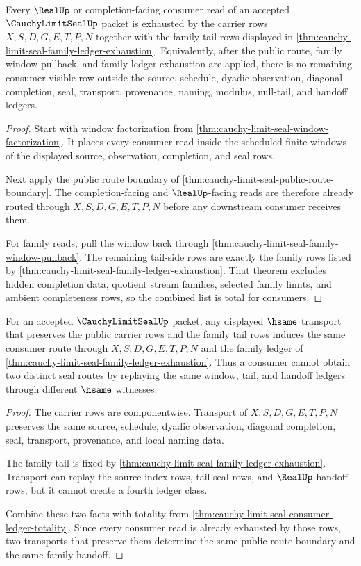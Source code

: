 \begin{theorem}
\label{thm:cauchy-limit-seal-consumer-ledger-totality}
Every $\RealUp$ or completion-facing consumer read of an accepted $\CauchyLimitSealUp$ packet is exhausted by the carrier rows $X,S,D,G,E,T,P,N$ together with the family tail rows displayed in \autoref{thm:cauchy-limit-seal-family-ledger-exhaustion}. Equivalently, after the public route, family window pullback, and family ledger exhaustion are applied, there is no remaining consumer-visible row outside the source, schedule, dyadic observation, diagonal completion, seal, transport, provenance, naming, modulus, null-tail, and handoff ledgers.
\end{theorem}
\begin{proof}
Start with window factorization from \autoref{thm:cauchy-limit-seal-window-factorization}. It places every consumer read inside the scheduled finite windows of the displayed source, observation, completion, and seal rows.

Next apply the public route boundary of \autoref{thm:cauchy-limit-seal-public-route-boundary}. The completion-facing and $\RealUp$-facing reads are therefore already routed through $X,S,D,G,E,T,P,N$ before any downstream consumer receives them.

For family reads, pull the window back through \autoref{thm:cauchy-limit-seal-family-window-pullback}. The remaining tail-side rows are exactly the family rows listed by \autoref{thm:cauchy-limit-seal-family-ledger-exhaustion}. That theorem excludes hidden completion data, quotient stream families, selected family limits, and ambient completeness rows, so the combined list is total for consumers.
\end{proof}

\begin{theorem}
\label{thm:cauchy-limit-seal-hsame-route-uniqueness}
For an accepted $\CauchyLimitSealUp$ packet, any displayed $\hsame$ transport that preserves the public carrier rows and the family tail rows induces the same consumer route through $X,S,D,G,E,T,P,N$ and the family ledger of \autoref{thm:cauchy-limit-seal-family-ledger-exhaustion}. Thus a consumer cannot obtain two distinct seal routes by replaying the same window, tail, and handoff ledgers through different $\hsame$ witnesses.
\end{theorem}
\begin{proof}
The carrier rows are componentwise. Transport of $X,S,D,G,E,T,P,N$ preserves the same source, schedule, dyadic observation, diagonal completion, seal, transport, provenance, and local naming data.

The family tail is fixed by \autoref{thm:cauchy-limit-seal-family-ledger-exhaustion}. Transport can replay the source-index rows, tail-seal rows, and $\RealUp$ handoff rows, but it cannot create a fourth ledger class.

Combine these two facts with totality from \autoref{thm:cauchy-limit-seal-consumer-ledger-totality}. Since every consumer read is already exhausted by those rows, two transports that preserve them determine the same public route boundary and the same family handoff.
\end{proof}

